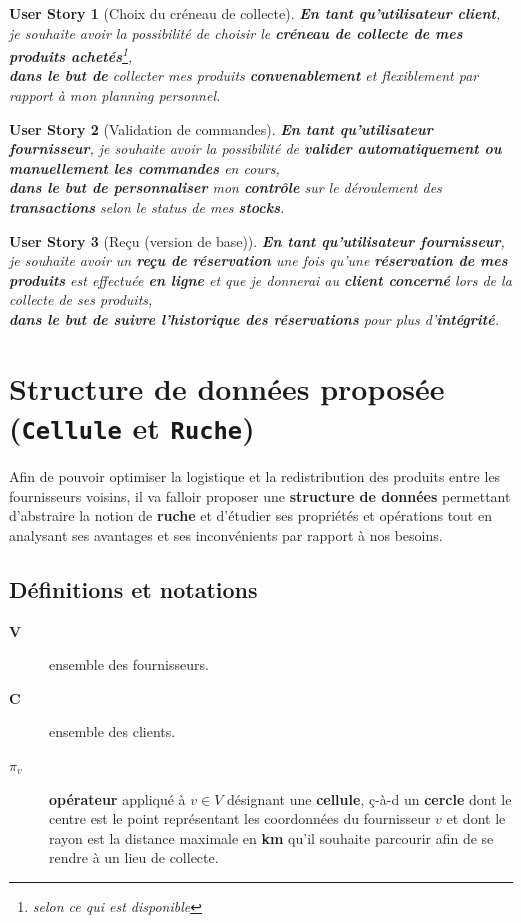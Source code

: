 \documentclass[a4paper,12pt]{report}
\theoremstyle{break}
\newtheorem*{userStory}{User Story}
\theoremstyle{break}
\theoremstyle{break}
\theoremstyle{break}
\theoremstyle{definition}
\theoremstyle{remark}
\begin{document}
\begin{userStory}[Choix du créneau de collecte]
\textbf{En tant qu'utilisateur {\color{green}client}}, je souhaite avoir la possibilité de choisir le \textbf{créneau de collecte de mes produits achetés}\footnote{selon ce qui est disponible},\\
\indent
\textbf{dans le but de} collecter mes produits \textbf{convenablement} et flexiblement par rapport à mon planning personnel.
\end{userStory}

\begin{userStory}[Validation de commandes]
\textbf{En tant qu'utilisateur {\color{red}fournisseur}}, je souhaite avoir la possibilité de \textbf{valider automatiquement ou manuellement les commandes} en cours,\\
\indent
\textbf{dans le but de personnaliser} mon \textbf{contrôle} sur le déroulement des \textbf{transactions} selon le status de mes \textbf{stocks}.
\end{userStory}

\begin{userStory}[Reçu (version de base)]
\textbf{En tant qu'utilisateur {\color{red}fournisseur}}, je souhaite avoir un \textbf{reçu de réservation} une fois qu'une \textbf{réservation de mes produits} est effectuée \textbf{en ligne} et que je donnerai au \textbf{{\color{green}client} concerné} lors de la collecte de ses produits,\\
\indent
\textbf{dans le but de suivre l'historique des réservations} pour plus d'\textbf{intégrité}.
\end{userStory}
\section{Structure de données proposée (\texttt{Cellule} et \texttt{Ruche})}
\label{sec:sd}
Afin de pouvoir optimiser la logistique et la redistribution des produits entre les fournisseurs voisins, il va falloir proposer une \textbf{structure de données} permettant d'abstraire la notion de \textbf{ruche} et d'étudier ses propriétés et opérations tout en analysant ses avantages et ses inconvénients par rapport à nos besoins.

\subsection{Définitions et notations}
\begin{description}
  \item[$\textbf{V}$]{ensemble des fournisseurs.}
  \item[$\textbf{C}$]{ensemble des clients.}
  \item[$\pi_v$]{\textbf{opérateur} appliqué à $v \in V$ désignant une \textbf{cellule}, ç-à-d un \textbf{cercle} dont le centre est le point représentant les coordonnées du fournisseur $v$ et dont le rayon est la distance maximale en \textbf{km} qu'il souhaite parcourir afin de se rendre à un lieu de collecte.}
\end{description}
\end{document}
